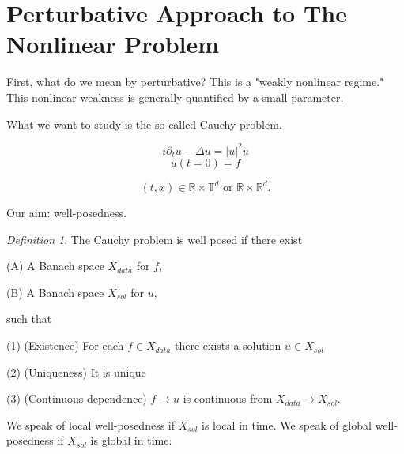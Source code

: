 \documentclass[11pt]{amsart}
\theoremstyle{plain}
\numberwithin{equation}{section}
\theoremstyle{remark}
\newtheorem{defn}[thm]{Definition}
\begin{document}
\part{Perturbative Approach to The Nonlinear Problem}

First, what do we mean by perturbative? This is a "weakly nonlinear regime." This nonlinear weakness is generally quantified by a small parameter. 

What we want to study is the so-called Cauchy problem. 

$$i\partial_t u -\Delta u= |u|^2 u$$
$$u(t=0)=f$$

$$(t,x)\in \mathbb{R} \times \mathbb{T}^d \, \,\text{or} \, \,  \mathbb{R} \times \mathbb{R}^d.$$

Our aim: well-posedness. 

\begin{defn}
The Cauchy problem is well posed if there exist 

(A) A Banach space $X_{data}$ for $f,$ 

(B) A Banach space $X_{sol}$ for $u,$

such that 

(1) (Existence) For each $f\in X_{data}$ there exists a solution $u\in X_{sol}$

(2) (Uniqueness) It is unique

(3) (Continuous dependence)  $f\rightarrow u$ is continuous from $X_{data} \rightarrow X_{sol}.$

\end{defn}

We speak of local well-posedness if $X_{sol}$ is local in time. 
We speak of global well-posedness if $X_{sol}$ is global in time. 
\end{document}
